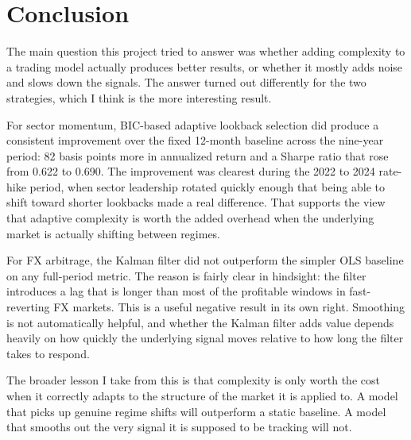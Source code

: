 \documentclass[12pt]{article}
\begin{document}
\section{Conclusion}

The main question this project tried to answer was whether adding complexity to a trading model actually produces better results, or whether it mostly adds noise and slows down the signals. The answer turned out differently for the two strategies, which I think is the more interesting result.

For sector momentum, BIC-based adaptive lookback selection did produce a consistent improvement over the fixed 12-month baseline across the nine-year period: 82 basis points more in annualized return and a Sharpe ratio that rose from 0.622 to 0.690. The improvement was clearest during the 2022 to 2024 rate-hike period, when sector leadership rotated quickly enough that being able to shift toward shorter lookbacks made a real difference. That supports the view that adaptive complexity is worth the added overhead when the underlying market is actually shifting between regimes.

For FX arbitrage, the Kalman filter did not outperform the simpler OLS baseline on any full-period metric. The reason is fairly clear in hindsight: the filter introduces a lag that is longer than most of the profitable windows in fast-reverting FX markets. This is a useful negative result in its own right. Smoothing is not automatically helpful, and whether the Kalman filter adds value depends heavily on how quickly the underlying signal moves relative to how long the filter takes to respond.

The broader lesson I take from this is that complexity is only worth the cost when it correctly adapts to the structure of the market it is applied to. A model that picks up genuine regime shifts will outperform a static baseline. A model that smooths out the very signal it is supposed to be tracking will not.
\end{document}
